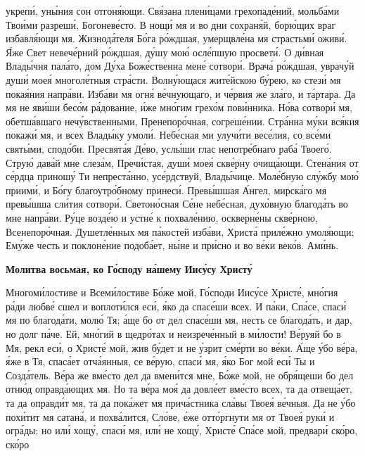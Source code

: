 укрепи́, уны́ния сон отгоня́ющи. Свя́зана плени́цами грехопаде́ний, мольба́ми
Твои́ми разреши́, Богоневе́сто. В нощи́ мя и во дни сохраня́й, борю́щих враг
избавля́ющи мя. Жизнода́теля Бо́га ро́ждшая, умерщвле́на мя страстьми́
оживи́. Я́же Свет невече́рний ро́ждшая, ду́шу мою́ осле́пшую просвети́. О
ди́вная Влады́чня пала́то, дом Ду́ха Боже́ственна мене́ сотвори́. Врача́
ро́ждшая, уврачу́й души́ моея́ многоле́тныя стра́сти. Волну́ющася
жите́йскою бу́рею, ко стези́ мя покая́ния напра́ви. Изба́ви мя огня́
ве́чнующаго, и че́рвия же зла́го, и та́ртара. Да мя не яви́ши бесо́м
ра́дование, и́же мно́гим грехо́м пови́нника. Но́ва сотвори́ мя, обетша́вшаго
нечу́вственными, Пренепоро́чная, согреше́нии. Стра́нна му́ки вся́кия покажи́
мя, и всех Влады́ку умоли́. Небе́сная ми улучи́ти весе́лия, со все́ми
святы́ми, сподо́би. Пресвята́я Де́во, услы́ши глас непотре́бнаго раба́
Твоего́. Струю́ дава́й мне слеза́м, Пречи́стая, души́ моея́ скве́рну
очища́ющи. Стена́ния от се́рдца приношу́ Ти непреста́нно, усе́рдствуй,
Влады́чице. Моле́бную слу́жбу мою́ приими́, и Бо́гу благоутро́бному
принеси́. Превы́шшая А́нгел, мирска́го мя превы́шша сли́тия сотвори́.
Светоно́сная Се́не небе́сная, духо́вную благода́ть во мне напра́ви. Ру́це
возде́ю и устне́ к похвале́нию, оскверне́ны скве́рною, Всенепоро́чная.
Душетле́нных мя па́костей изба́ви, Христа́ приле́жно умоля́ющи;
Ему́же честь и поклоне́ние подоба́ет, ны́не и при́сно и во ве́ки веко́в.
Ами́нь.



 

\bfseries Молитва восьмая, ко Го́споду на́шему Иису́су Христу́\normalfont{}


   Многоми́лостиве и Всеми́лостиве Бо́же мой, Го́споди Иису́се Христе́,
мно́гия ра́ди любве́ сшел и воплоти́лся еси́, я́ко да спасе́ши всех. И па́ки,
Спа́се, спаси́ мя по благода́ти, молю́ Тя; а́ще бо от дел спасе́ши мя,
несть се благода́ть, и дар, но долг па́че. Ей, мно́гий в щедро́тах и
неизрече́нный в ми́лости! Ве́руяй бо в Мя, рекл еси́, о Христе́ мой, жив
бу́дет и не у́зрит сме́рти во ве́ки. А́ще у́бо ве́ра, я́же в Тя, спаса́ет
отча́янныя, се ве́рую, спаси́ мя, я́ко Бог мой еси́ Ты и Созда́тель.
Ве́ра же вме́сто дел да вмени́тся мне, Бо́же мой, не обря́щеши бо
дел отню́д оправда́ющих мя. Но та ве́ра моя́ да довле́ет вме́сто всех,
та да отвеща́ет, та да оправди́т мя, та да пока́жет мя прича́стника
сла́вы Твоея́ ве́чныя. Да не у́бо похи́тит мя сатана́, и похва́лится,
Сло́ве, е́же отто́ргнути мя от Твоея́ руки́ и огра́ды; но или́ хощу́,
спаси́ мя, или́ не хощу́, Христе́ Спа́се мой, предвари́ ско́ро, ско́ро

